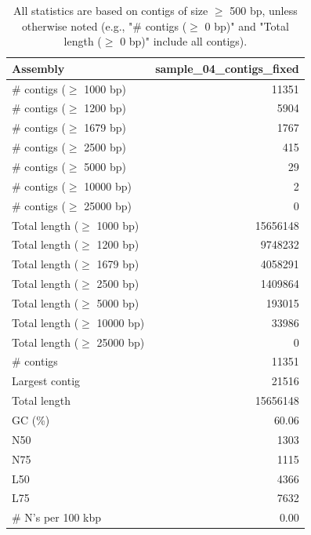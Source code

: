 \documentclass[12pt,a4paper]{article}
\begin{document}
\begin{table}[ht]
\begin{center}
\caption{All statistics are based on contigs of size $\geq$ 500 bp, unless otherwise noted (e.g., "\# contigs ($\geq$ 0 bp)" and "Total length ($\geq$ 0 bp)" include all contigs).}
\begin{tabular}{|l*{1}{|r}|}
\hline
Assembly & sample\_04\_contigs\_fixed \\ \hline
\# contigs ($\geq$ 1000 bp) & 11351 \\ \hline
\# contigs ($\geq$ 1200 bp) & 5904 \\ \hline
\# contigs ($\geq$ 1679 bp) & 1767 \\ \hline
\# contigs ($\geq$ 2500 bp) & 415 \\ \hline
\# contigs ($\geq$ 5000 bp) & 29 \\ \hline
\# contigs ($\geq$ 10000 bp) & 2 \\ \hline
\# contigs ($\geq$ 25000 bp) & 0 \\ \hline
Total length ($\geq$ 1000 bp) & 15656148 \\ \hline
Total length ($\geq$ 1200 bp) & 9748232 \\ \hline
Total length ($\geq$ 1679 bp) & 4058291 \\ \hline
Total length ($\geq$ 2500 bp) & 1409864 \\ \hline
Total length ($\geq$ 5000 bp) & 193015 \\ \hline
Total length ($\geq$ 10000 bp) & 33986 \\ \hline
Total length ($\geq$ 25000 bp) & 0 \\ \hline
\# contigs & 11351 \\ \hline
Largest contig & 21516 \\ \hline
Total length & 15656148 \\ \hline
GC (\%) & 60.06 \\ \hline
N50 & 1303 \\ \hline
N75 & 1115 \\ \hline
L50 & 4366 \\ \hline
L75 & 7632 \\ \hline
\# N's per 100 kbp & 0.00 \\ \hline
\end{tabular}
\end{center}
\end{table}
\end{document}
